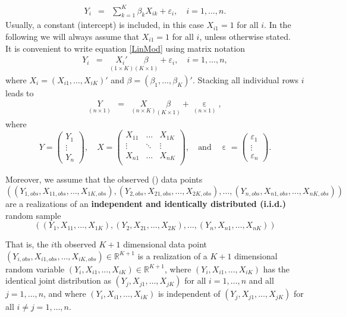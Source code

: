 \documentclass[
  14pt,
]{memoir}
\DeclareMathOperator{\eps}{\varepsilon}
\begin{document}
\begin{eqnarray}\label{LinMod}
  Y_i&=&\sum_{k=1}^K\beta_k X_{ik}+\varepsilon_i, \quad i=1,\dots,n.
\end{eqnarray}
Usually, a constant (intercept) is included, in this case \(X_{i1}=1\) for all \(i\).
In the following we will always assume that \(X_{i1}=1\) for all \(i\), unless otherwise stated.\\
It is convenient to write equation \eqref{LinMod} using matrix notation
\begin{eqnarray*}
  Y_i&=&\underset{(1\times K)}{X_i'}\underset{(K\times 1)}{\beta} +\varepsilon_i, \quad i=1,\dots,n,
\end{eqnarray*}
where \(X_i=(X_{i1},\dots,X_{iK})'\) and \(\beta=(\beta_1,\dots,\beta_K)'\). Stacking all individual rows \(i\) leads to
\begin{eqnarray}\label{LM}
  \underset{(n\times 1)}{Y}&=&\underset{(n\times K)}{X}\underset{(K\times 1)}{\beta} + \underset{(n\times 1)}{\eps},
\end{eqnarray}
where
\begin{equation*}
Y=\left(\begin{matrix}Y_1\\ \vdots\\Y_n\end{matrix}\right),\quad X=\left(\begin{matrix}X_{11}&\dots&X_{1K}\\\vdots&\ddots&\vdots\\ X_{n1}&\dots&X_{nK}\\\end{matrix}\right),\quad\text{and}\quad \eps=\left(\begin{matrix}\varepsilon_1\\ \vdots\\ \varepsilon_n\end{matrix}\right).
\end{equation*}

\bigskip

Moreover, we assume that the observed () data points
\[((Y_{1,obs},X_{11,obs},\dots,X_{1K,obs}),(Y_{2,obs},X_{21,obs},\dots,X_{2K,obs}),\dots,(Y_{n,obs},X_{n1,obs},\dots,X_{nK,obs}))\]
are a realizations of an \textbf{independent and identically distributed (i.i.d.)} random sample
\[((Y_{1},X_{11},\dots,X_{1K}),(Y_{2},X_{21},\dots,X_{2K}),\dots,(Y_{n},X_{n1},\dots,X_{nK}))\]

That is, the \(i\)th observed \(K+1\) dimensional data point
\((Y_{i,obs},X_{i1,obs},\dots,X_{iK,obs})\in\mathbb{R}^{K+1}\)
is a realization of a \(K+1\) dimensional random variable
\((Y_{i},X_{i1},\dots,X_{iK})\in\mathbb{R}^{K+1}\),
where \((Y_{i},X_{i1},\dots,X_{iK})\) has the identical joint distribution as
\((Y_{j},X_{j1},\dots,X_{jK})\) for all \(i=1,\dots,n\) and all \(j=1,\dots,n\),
and where
\((Y_{i},X_{i1},\dots,X_{iK})\) is independent of
\((Y_{j},X_{j1},\dots,X_{jK})\) for all \(i\neq j=1,\dots,n\).
\end{document}
